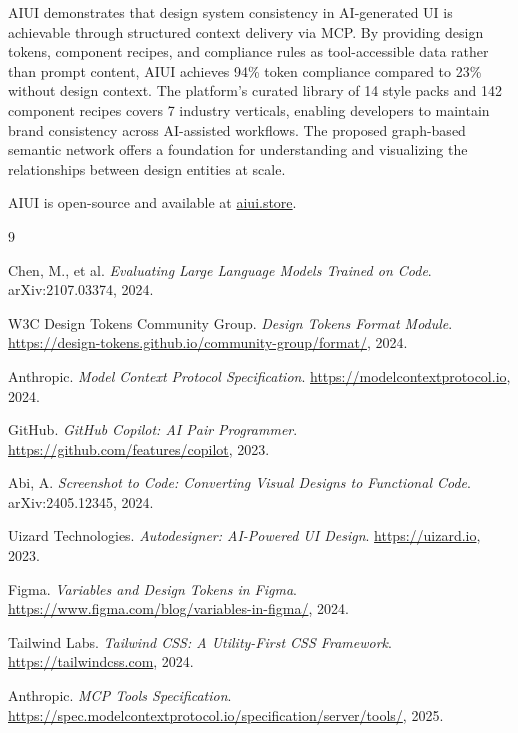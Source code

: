 \documentclass[11pt,twocolumn]{article}
\begin{document}
AIUI demonstrates that design system consistency in AI-generated UI is achievable through structured context delivery via MCP. By providing design tokens, component recipes, and compliance rules as tool-accessible data rather than prompt content, AIUI achieves 94\% token compliance compared to 23\% without design context. The platform's curated library of 14 style packs and 142 component recipes covers 7 industry verticals, enabling developers to maintain brand consistency across AI-assisted workflows. The proposed graph-based semantic network offers a foundation for understanding and visualizing the relationships between design entities at scale.

AIUI is open-source and available at \href{https://aiui.store}{aiui.store}.

\begin{thebibliography}{9}

Chen, M., et al.
\textit{Evaluating Large Language Models Trained on Code}.
arXiv:2107.03374, 2024.

W3C Design Tokens Community Group.
\textit{Design Tokens Format Module}.
\url{https://design-tokens.github.io/community-group/format/}, 2024.

Anthropic.
\textit{Model Context Protocol Specification}.
\url{https://modelcontextprotocol.io}, 2024.

GitHub.
\textit{GitHub Copilot: AI Pair Programmer}.
\url{https://github.com/features/copilot}, 2023.

Abi, A.
\textit{Screenshot to Code: Converting Visual Designs to Functional Code}.
arXiv:2405.12345, 2024.

Uizard Technologies.
\textit{Autodesigner: AI-Powered UI Design}.
\url{https://uizard.io}, 2023.

Figma.
\textit{Variables and Design Tokens in Figma}.
\url{https://www.figma.com/blog/variables-in-figma/}, 2024.

Tailwind Labs.
\textit{Tailwind CSS: A Utility-First CSS Framework}.
\url{https://tailwindcss.com}, 2024.

Anthropic.
\textit{MCP Tools Specification}.
\url{https://spec.modelcontextprotocol.io/specification/server/tools/}, 2025.

\end{thebibliography}
\end{document}
